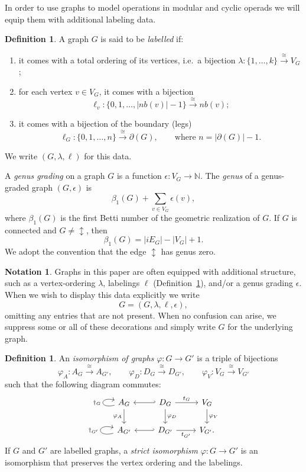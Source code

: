\documentclass{amsart}
\newcommand{\mrnote}[1]{\marginpar{\RaggedRight\tiny{\color{red}#1}}}
\newcommand{\nb}{nb}
\theoremstyle{definition}
\newtheorem{definition}[theorem]{Definition}%
\newtheorem{notation}[theorem]{Notation}
\numberwithin{equation}{section}
\begin{document}
In order to use graphs to model operations in modular and cyclic operads we will equip them with additional labeling data.

\begin{definition}\label{def: labelled graph}
A graph $G$ is said to be \emph{labelled} if:
\begin{enumerate}
\item it comes with a total ordering of its vertices, i.e.\ a bijection
      $\lambda:\{1,\ldots,k\}\xrightarrow{\cong} V_G$;
\item for each vertex $v\in V_G$, it comes with a bijection 
      \[
      \ell_v:\{0,1,\ldots,|\nb(v)|-1\}\xrightarrow{\cong}\nb(v);
      \]
\item it comes with a bijection of the boundary (legs)
      \[
      \ell_G:\{0,1,\ldots,n\}\xrightarrow{\cong} \partial(G),
      \qquad\text{where } n=|\partial(G)|-1.
      \] 
\end{enumerate}
We write $(G,\lambda,\ell)$ for this data. 
\end{definition}


A \emph{genus grading} on a graph $G$ is a function $\epsilon:V_G\to \mathbb{N}$. The \emph{genus}
of a genus-graded graph $(G,\epsilon)$ is
\[
\beta_1(G)+\sum_{v\in V_G}\epsilon(v),
\]
where $\beta_1(G)$ is the first Betti number of the geometric realization of $G$.
If $G$ is connected and $G\neq \updownarrow$, then
\[
\beta_1(G)=|iE_G|-|V_G|+1.
\]
We adopt the convention that the edge $\updownarrow$ has genus zero.

\begin{notation}\label{not:decorated-graphs}
Graphs in this paper are often equipped with additional structure, such as a vertex-ordering $\lambda$,
labelings $\ell$ (Definition~\ref{def: labelled graph}), and/or a genus grading $\epsilon$.
When we wish to display this data explicitly we write
\[
G=(G,\lambda,\ell,\epsilon),
\]
omitting any entries that are not present. When no confusion can arise, we suppress some or all of
these decorations and simply write $G$ for the underlying graph.
\end{notation}


\begin{definition}\label{def: iso of graphs}
An \emph{isomorphism of graphs} $\varphi:G\to G'$ is a triple of bijections
\[
\varphi_A:A_G\xrightarrow{\cong} A_{G'},\qquad
\varphi_D:D_G\xrightarrow{\cong} D_{G'},\qquad
\varphi_V:V_G\xrightarrow{\cong} V_{G'}
\]
such that the following diagram commutes:
\[
\begin{tikzcd}
A_G \arrow[d,"\varphi_A"'] \arrow[loop left,"\dagger_G"] &
D_G \arrow[l,hook'] \arrow[d,"\varphi_D"] \arrow[r,"t_G"] &
V_G \arrow[d,"\varphi_V"] \\
A_{G'} \arrow[loop left,"\dagger_{G'}"] &
D_{G'} \arrow[l,hook'] \arrow[r,"t_{G'}"'] &
V_{G'} .
\end{tikzcd}
\]
If $G$ and $G'$ are labelled graphs, a \emph{strict isomorphism} $\varphi:G\to G'$ is an isomorphism that preserves the vertex ordering and the labelings.
\end{definition}
\end{document}
